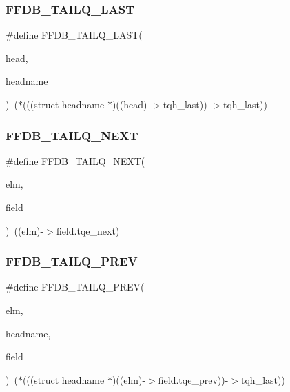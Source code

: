 \subsubsection{\texorpdfstring{FFDB\_TAILQ\_LAST}{FFDB\_TAILQ\_LAST}}
{\footnotesize\ttfamily \#define F\+F\+D\+B\+\_\+\+T\+A\+I\+L\+Q\+\_\+\+L\+A\+ST(\begin{DoxyParamCaption}\item[{}]{head,  }\item[{}]{headname }\end{DoxyParamCaption})~($\ast$(((struct headname $\ast$)((head)-\/$>$tqh\+\_\+last))-\/$>$tqh\+\_\+last))}

\mbox{\label{adat-devel_2other__libs_2filedb_2filehash_2ffdb__cq_8h_ab7973d50130de65e2b746012b6ea7ada}} 
\subsubsection{\texorpdfstring{FFDB\_TAILQ\_NEXT}{FFDB\_TAILQ\_NEXT}}
{\footnotesize\ttfamily \#define F\+F\+D\+B\+\_\+\+T\+A\+I\+L\+Q\+\_\+\+N\+E\+XT(\begin{DoxyParamCaption}\item[{}]{elm,  }\item[{}]{field }\end{DoxyParamCaption})~((elm)-\/$>$field.\+tqe\+\_\+next)}

\mbox{\label{adat-devel_2other__libs_2filedb_2filehash_2ffdb__cq_8h_a2678321bd4ede50f5ea96d441d91753e}} 
\subsubsection{\texorpdfstring{FFDB\_TAILQ\_PREV}{FFDB\_TAILQ\_PREV}}
{\footnotesize\ttfamily \#define F\+F\+D\+B\+\_\+\+T\+A\+I\+L\+Q\+\_\+\+P\+R\+EV(\begin{DoxyParamCaption}\item[{}]{elm,  }\item[{}]{headname,  }\item[{}]{field }\end{DoxyParamCaption})~($\ast$(((struct headname $\ast$)((elm)-\/$>$field.\+tqe\+\_\+prev))-\/$>$tqh\+\_\+last))}

